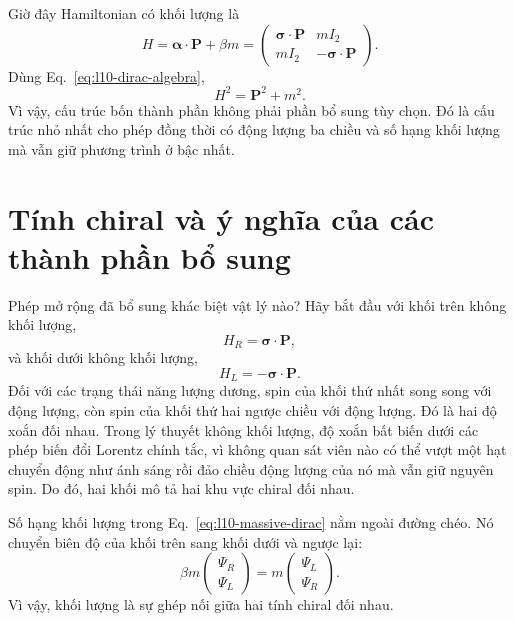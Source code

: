 Giờ đây Hamiltonian có khối lượng là
\begin{equation}
H=\boldsymbol{\alpha}\cdot\mathbf P+\beta m
=
\begin{pmatrix}
\boldsymbol{\sigma}\cdot\mathbf P&mI_2\\
mI_2&-\boldsymbol{\sigma}\cdot\mathbf P
\end{pmatrix}.
\label{eq:l10-massive-dirac}
\end{equation}
Dùng Eq.~\eqref{eq:l10-dirac-algebra},
\begin{equation}
H^2=\mathbf P^2+m^2.
\end{equation}
Vì vậy, cấu trúc bốn thành phần không phải phần bổ sung tùy chọn. Đó là cấu trúc nhỏ nhất cho phép đồng thời có động lượng ba chiều và số hạng khối lượng mà vẫn giữ phương trình ở bậc nhất.

\section{Tính chiral và ý nghĩa của các thành phần bổ sung}

Phép mở rộng đã bổ sung khác biệt vật lý nào? Hãy bắt đầu với khối trên không khối lượng,
\begin{equation}
H_R=\boldsymbol{\sigma}\cdot\mathbf P,
\end{equation}
và khối dưới không khối lượng,
\begin{equation}
H_L=-\boldsymbol{\sigma}\cdot\mathbf P.
\end{equation}
Đối với các trạng thái năng lượng dương, spin của khối thứ nhất song song với động lượng, còn spin của khối thứ hai ngược chiều với động lượng. Đó là hai độ xoắn đối nhau. Trong lý thuyết không khối lượng, độ xoắn bất biến dưới các phép biến đổi Lorentz chính tắc, vì không quan sát viên nào có thể vượt một hạt chuyển động như ánh sáng rồi đảo chiều động lượng của nó mà vẫn giữ nguyên spin. Do đó, hai khối mô tả hai khu vực chiral đối nhau.

\begin{classroomqa}
\end{classroomqa}

Số hạng khối lượng trong Eq.~\eqref{eq:l10-massive-dirac} nằm ngoài đường chéo. Nó chuyển biên độ của khối trên sang khối dưới và ngược lại:
\begin{equation}
\beta m
\begin{pmatrix}
\Psi_R\\
\Psi_L
\end{pmatrix}
=
m
\begin{pmatrix}
\Psi_L\\
\Psi_R
\end{pmatrix}.
\end{equation}
Vì vậy, khối lượng là sự ghép nối giữa hai tính chiral đối nhau.

